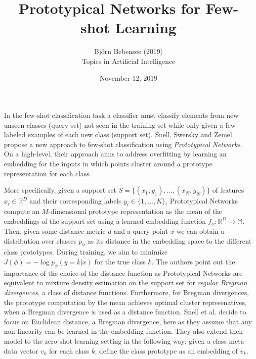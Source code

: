 \documentclass[12pt]{article}
\begin{document}
 
 
\title{Prototypical Networks for Few-shot Learning}
\author{Bj\"orn Bebensee (2019)\\ %
Topics in Artificial Intelligence}
\date{November 12, 2019}
\maketitle

\noindent
In the few-shot classification task a classifier must classify elements from new unseen classes (query set) not seen in the training set while only given a few labeled examples of each new class (support set). Snell, Swersky and Zemel~\cite{snell} propose a new approach to few-shot classification using \emph{Prototypical Networks}. On a high-level, their approach aims to address overfitting by learning an embedding for the inputs in which points cluster around a prototype representation for each class.

More specifically, given a support set $S = \{ (x_1, y_1), \ldots, (x_N, y_N) \}$ of features $x_i \in \mathbb{R}^D$ and their corresponding labels $y_i \in \{1, \ldots, K\}$, Prototypical Networks compute an $M$-dimensional prototype representation as the mean of the embeddings of the support set using a learned embedding function $f_\phi: \mathbb{R}^D \rightarrow \mathbb{M}$. Then, given some distance metric $d$ and a query point $x$ we can obtain a distribution over classes $p_\phi$ as its distance in the embedding space to the different class prototypes. During training, we aim to minimize $J(\phi) = -\log p_\phi(y = k | x)$ for the true class $k$. The authors point out the importance of the choice of the distance function as Prototypical Networks are equivalent to mixture density estimation on the support set for \emph{regular Bregman divergences}, a class of distance functions. Furthermore, for Bregman divergences, the prototype computation by the mean achieves optimal cluster represenatives, when a Bregman divergence is used as a distance function. Snell et al. decide to focus on Euclidean distance, a Bregman divergence, here as they assume that any non-linearity can be learned in the embedding function. They also extend their model to the zero-shot learning setting in the following way: given a class meta-data vector $v_k$ for each class $k$, define the class prototype as an embedding of $v_k$.
\end{document}
